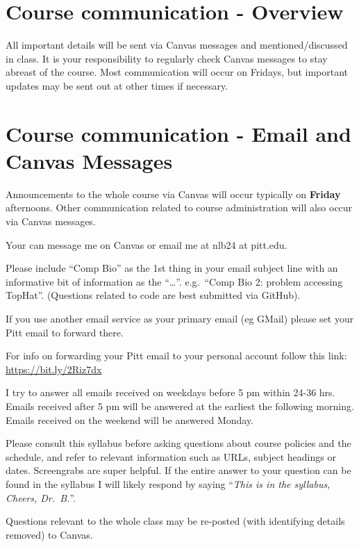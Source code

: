 \documentclass[
]{book}
\begin{document}
\hypertarget{course-communication---overview}{%
\chapter{Course communication - Overview}\label{course-communication---overview}}

All important details will be sent via Canvas messages and mentioned/discussed in class. It is your responsibility to regularly check Canvas messages to stay abreast of the course. Most communication will occur on Fridays, but important updates may be sent out at other times if necessary.

\hypertarget{email_and_canvas_msg}{%
\chapter{Course communication - Email and Canvas Messages}\label{email_and_canvas_msg}}

Announcements to the whole course via Canvas will occur typically on \textbf{Friday} afternoons. Other communication related to course administration will also occur via Canvas messages.

Your can message me on Canvas or email me at nlb24 at pitt.edu.

Please include ``Comp Bio'' as the 1st thing in your email subject line with an informative bit of information as the ``\ldots{}''. e.g.~``Comp Bio 2: problem accessing TopHat''. (Questions related to code are best submitted via GitHub).

If you use another email service as your primary email (eg GMail) please set your Pitt email to forward there.

For info on forwarding your Pitt email to your personal account follow this link: \url{https://bit.ly/2Riz7dx}

I try to answer all emails received on weekdays before 5 pm within 24-36 hrs. Emails received after 5 pm will be answered at the earliest the following morning. Emails received on the weekend will be answered Monday.

Please consult this syllabus before asking questions about course policies and the schedule, and refer to relevant information such as URLs, subject headings or dates. Screengrabs are super helpful. If the entire answer to your question can be found in the syllabus I will likely respond by saying ``\emph{This is in the syllabus, Cheers, Dr.~B.}''.

Questions relevant to the whole class may be re-posted (with identifying details removed) to Canvas.
\end{document}
